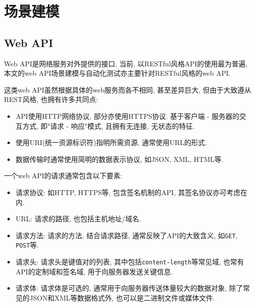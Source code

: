 \chapter{场景建模}
    
    \section{Web API}
        Web API是网络服务对外提供的接口, 当前, 以RESTful风格API的使用最为普遍, 本文的web API场景建模与自动化测试亦主要针对RESTful风格的web API.
        
        这类web API虽然根据具体的web服务而各不相同, 甚至差异巨大, 但由于大致遵从REST风格\cite{fielding2000architectural}, 也拥有许多共同点:
        
        \begin{itemize}
            \item API使用HTTP网络协议, 部分亦使用HTTPS协议. 基于客户端 - 服务器的交互方式, 即"请求 - 响应"模式, 且拥有无连接, 无状态的特征.  
            
            \item 使用URI(统一资源标识符)指明所需资源, 通常使用URL的形式.
            
            \item 数据传输时通常使用简明的数据表示协议, 如JSON, XML, HTML等.
        \end{itemize}
        
        一个web API的请求通常包含以下要素:
        \begin{itemize}
            \item 请求协议: 如HTTP, HTTPS等, 包含签名机制的API, 其签名协议亦可考虑在内.
            
            \item URL: 请求的路径, 也包括主机地址/域名.
            
            \item 请求方法: 请求的方法, 结合请求路径, 通常反映了API的大致含义, 如\texttt{GET}, \texttt{POST}等.
            
            \item 请求头: 请求头是键值对的列表, 其中包括\texttt{content-length}等常见域, 也常有API的定制域和签名域, 用于向服务器发送关键信息.
            
            \item 请求体: 请求体是可选的, 通常用于向服务器传送体量较大的数据对象, 除了常见的JSON和XML等数据格式外, 也可以是二进制文件或媒体文件.
        \end{itemize}
        
